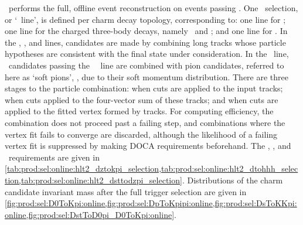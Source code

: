 \hlttwo\ performs the full, offline event reconstruction on events passing 
\hltone.
One \hlttwo\ selection, or `\hlttwo\ line', is defined per charm decay 
topology, corresponding to: one line for \DzToKpi; one line for the charged 
three-body decays, namely \DpToKpipi\ and \DspToKKpi; and one line for 
\DstToDzpi.
In the \PDzero, \PDplus, and \PDsplus lines, candidates are made by combining 
long tracks whose particle hypotheses are consistent with the final state under 
consideration.
In the \PDstarp\ line, \PDzero\ candidates passing the \PDzero\ \hlttwo\ line 
are combined with pion candidates, referred to here as `soft pions', 
\Ppiplussoft, due to their soft momentum distribution.
There are three stages to the particle combination: when cuts are applied to 
the input tracks; when cuts applied to the four-vector sum of these tracks; and 
when cuts are applied to the fitted vertex formed by tracks.
For computing efficiency, the combination does not proceed past a failing step, 
and combinations where the vertex fit fails to converge are discarded, although 
the likelihood of a failing vertex fit is suppressed by making \ac{DOCA} 
requirements beforehand.
The \DzToKpi, \DTohhh, and \DstToDzpi\ requirements are given in 
\cref{tab:prod:sel:online:hlt2_dztokpi_selection,tab:prod:sel:online:hlt2_dtohhh_selection,tab:prod:sel:online:hlt2_dsttodzpi_selection}.
Distributions of the charm candidate invariant mass after the full trigger 
selection are given in 
\cref{fig:prod:sel:D0ToKpi:online,fig:prod:sel:DpToKpipi:online,fig:prod:sel:DsToKKpi:online,fig:prod:sel:DstToD0pi_D0ToKpi:online}.

\begin{table}
  \caption{%
    List of fills used in analysis, along with the integrated luminosity 
    \intlumi, the \lzero\ \nobias\ rate, and the corresponding effective 
    \lzero\ efficiency (``eff.'') for each fill.
  }
  \label{tab:prod:sel:online:l0_nobias_rateeff}
  \centering
  
\end{table}

\begin{table}
  \caption{%
    Requirements made on the track that fires the \hltone\ trigger line.
  }
  \label{tab:prod:sel:online:hlt1_selection}
  \centering
  
\end{table}

\begin{table}
  \caption{%
    Requirements made in the \hlttwo\ \DzToKpi\ selection.
    The track \chisq\ criterion is applied in the reconstruction and listed 
    here for completeness.
  }
  \label{tab:prod:sel:online:hlt2_dztokpi_selection}
  \centering
  
\end{table}

